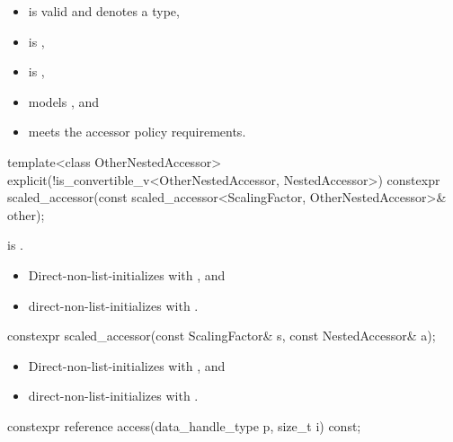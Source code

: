 \pnum
\mandates
\begin{itemize}
\item
{} is valid and denotes a type,
\item
{} is ,
\item
{} is ,
\item
{} models , and
\item
{} meets the accessor policy requirements.
\end{itemize}

%
\begin{itemdecl}
template<class OtherNestedAccessor>
  explicit(!is_convertible_v<OtherNestedAccessor, NestedAccessor>)
    constexpr scaled_accessor(const scaled_accessor<ScalingFactor, OtherNestedAccessor>& other);
\end{itemdecl}

\begin{itemdescr}
\pnum
\constraints
{} is .

\pnum
\effects
\begin{itemize}
\item
Direct-non-list-initializes 
with , and
\item
direct-non-list-initializes 
with .
\end{itemize}
\end{itemdescr}

%
\begin{itemdecl}
constexpr scaled_accessor(const ScalingFactor& s, const NestedAccessor& a);
\end{itemdecl}

\begin{itemdescr}
\pnum
\effects
\begin{itemize}
\item
Direct-non-list-initializes  with , and
\item
direct-non-list-initializes  with .
\end{itemize}
\end{itemdescr}

%
\begin{itemdecl}
constexpr reference access(data_handle_type p, size_t i) const;
\end{itemdecl}

